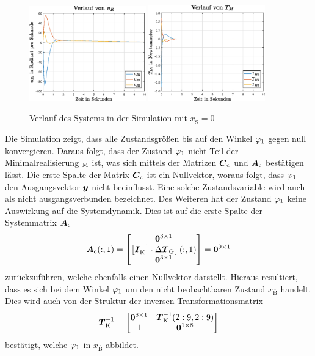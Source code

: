 \begin{figure}[!ht]
\centering
\includegraphics[width=0.45\textwidth]{img/lin_sim1_ur.eps}\hspace{0.7cm}
\includegraphics[width=0.45\textwidth]{img/lin_sim1_tm.eps}
\caption{Verlauf des Systems in der Simulation mit $x_{\overline{\text{S}}}=0$}
\end{figure}
Die Simulation zeigt, dass alle Zustandsgrößen bis auf den Winkel $\varphi_{\text{1}}$ gegen null konvergieren. Daraus folgt, dass der Zustand $\varphi_{\text{1}}$ nicht Teil der Minimalrealisierung $_{\text{M}}$ ist, was sich mittels der Matrizen $\boldsymbol{C}_{\text{c}}$ und $\boldsymbol{A}_{\text{c}}$ bestätigen lässt. Die erste Spalte der Matrix $\boldsymbol{C}_{\text{c}}$ ist ein Nullvektor, woraus folgt, dass $\varphi_{\text{1}}$ den Ausgangsvektor $\boldsymbol{y}$ nicht beeinflusst. Eine solche Zustandsvariable wird auch als nicht ausgangsverbunden bezeichnet. Des Weiteren hat der Zustand $\varphi_{\text{1}}$ keine Auswirkung auf die Systemdynamik. Dies ist auf die erste Spalte der Systemmatrix $\boldsymbol{A}_{\text{c}}$
\begin{equation}
\boldsymbol{A}_{\text{c}}(:,1) = \begin{bmatrix}
\boldsymbol{0}^{3\times 1} \\ \left[\boldsymbol{I}^{-1}_{\text{K}}\cdot \Delta\boldsymbol{T}_{\text{G}}\right](:,1)\\ \boldsymbol{0}^{3\times 1}
\end{bmatrix} = \boldsymbol{0}^{9\times 1}
\end{equation}
zurückzuführen, welche ebenfalls einen Nullvektor darstellt. Hieraus resultiert, dass es sich bei dem Winkel $\varphi_{\text{1}}$ um den nicht beobachtbaren Zustand $x_{\overline{\text{B}}}$ handelt. Dies wird auch von der Struktur der inversen Transformationsmatrix
\begin{equation}
\boldsymbol{T}^{-1}_{\text{K}} = \begin{bmatrix}
\boldsymbol{0}^{8\times 1} & \boldsymbol{T}^{-1}_{\text{K}}(2:9,2:9) \\
1 & \boldsymbol{0}^{1\times 8}
\end{bmatrix}
\end{equation}
bestätigt, welche $\varphi_{\text{1}}$ in $x_{\overline{\text{B}}}$ abbildet.

